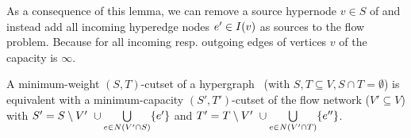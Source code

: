 As a consequence of this lemma, we can remove 
a source hypernode $v \in S$ of  and instead add all
incoming hyperedge nodes $e' \in I(v)$ as sources to the flow 
problem. Because for all incoming resp. outgoing edges of vertices $v$ of 
 the capacity is $\infty$.

\begin{theorem}
\label{theorem:st_cutset_equal}
A minimum-weight $(S,T)$-cutset of a hypergraph \HypergraphDef~(with $S,T \subseteq V,
S \cap T = \emptyset$) is equivalent with a minimum-capacity $(S',T')$-cutset of the
flow network  ($V' \subseteq V$) with $S' = S \setminus V'\ \cup \bigcup\limits_{e \in N(V' \cap S)} \{e'\}$ and 
$T' = T \setminus V'\ \cup \bigcup\limits_{e \in N(V'\cap T)} \{e''\}$.
\label{theorem:heuer_network}
\end{theorem}

